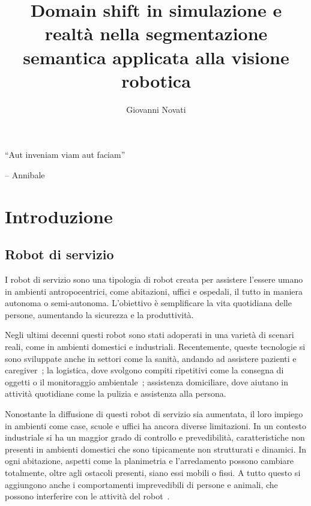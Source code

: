 \documentclass[12pt]{report}
\title{Domain shift in simulazione e realtà nella segmentazione semantica applicata alla visione robotica}
\author{Giovanni Novati}
\begin{document}
\makefrontpage

{\raggedleft \large \sl
	
	\vspace{2cm}
	
	``Aut inveniam viam aut faciam''
	
	\bigskip
	
	\--- Annibale\\}

\beforepreface

\afterpreface

\chapter{Introduzione}
\label{cap:introduzione}

\section{Robot di servizio}
\label{sec:robot_servizio}

I robot di servizio sono una tipologia di robot creata per assistere l'essere umano in ambienti antropocentrici, come abitazioni, uffici e ospedali, il tutto in maniera autonoma o semi-autonoma. L'obiettivo è semplificare la vita quotidiana delle persone, aumentando la sicurezza e la produttività.

Negli ultimi decenni questi robot sono stati adoperati in una varietà di scenari reali, come in ambienti domestici e industriali. Recentemente, queste tecnologie si sono sviluppate anche in settori come la sanità, andando ad assistere pazienti e caregiver~\cite{robotics10010047}; la logistica, dove svolgono compiti ripetitivi come la consegna di oggetti o il monitoraggio ambientale~\cite{fragapane2021405}; assistenza domiciliare, dove aiutano in attività quotidiane come la pulizia e assistenza alla persona.

Nonostante la diffusione di questi robot di servizio sia aumentata, il loro impiego in ambienti come case, scuole e uffici ha ancora diverse limitazioni. In un contesto industriale si ha un maggior grado di controllo e prevedibilità, caratteristiche non presenti in ambienti domestici che sono tipicamente non strutturati e dinamici. In ogni abitazione, aspetti come la planimetria e l'arredamento possono cambiare totalmente, oltre agli ostacoli presenti, siano essi mobili o fissi. A tutto questo si aggiungono anche i comportamenti imprevedibili di persone e animali, che possono interferire con le attività del robot~\cite{6301139}.
\end{document}
